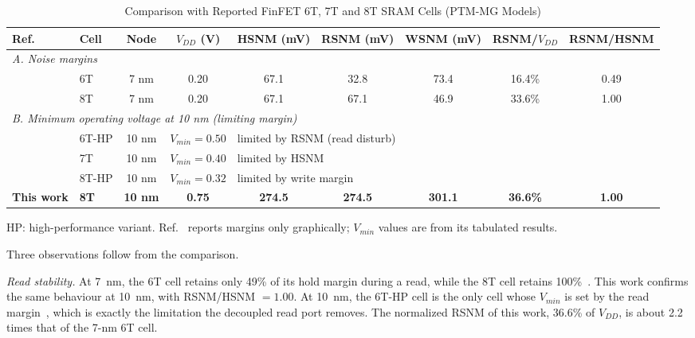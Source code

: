 \documentclass[conference]{IEEEtran}
\begin{document}
\begin{table}[t]
\centering
\begin{threeparttable}
\caption{Comparison with Reported FinFET 6T, 7T and 8T SRAM Cells (PTM-MG Models)}
\label{tab:compare}
\begin{tabular}{llccccccc}
\toprule
\textbf{Ref.} & \textbf{Cell} & \textbf{Node} & \textbf{$V_{DD}$ (V)} & \textbf{HSNM (mV)} & \textbf{RSNM (mV)} & \textbf{WSNM (mV)} & \textbf{RSNM/$V_{DD}$} & \textbf{RSNM/HSNM} \\
\midrule
\multicolumn{9}{l}{\textit{A. Noise margins}} \\
\cite{abbasian2022comp} & 6T & 7 nm & 0.20 & 67.1 & 32.8 & 73.4 & 16.4\% & 0.49 \\
\cite{abbasian2022comp} & 8T & 7 nm & 0.20 & 67.1 & 67.1 & 46.9 & 33.6\% & 1.00 \\
\midrule
\multicolumn{9}{l}{\textit{B. Minimum operating voltage at 10 nm (limiting margin)}} \\
\cite{ansari2015near7t} & 6T-HP & 10 nm & $V_{min}=0.50$ & \multicolumn{5}{l}{limited by RSNM (read disturb)} \\
\cite{ansari2015near7t} & 7T & 10 nm & $V_{min}=0.40$ & \multicolumn{5}{l}{limited by HSNM} \\
\cite{ansari2015near7t} & 8T-HP & 10 nm & $V_{min}=0.32$ & \multicolumn{5}{l}{limited by write margin} \\
\midrule
\textbf{This work} & \textbf{8T} & \textbf{10 nm} & \textbf{0.75} & \textbf{274.5} & \textbf{274.5} & \textbf{301.1} & \textbf{36.6\%} & \textbf{1.00} \\
\bottomrule
\end{tabular}
\begin{tablenotes}\footnotesize
\item HP: high-performance variant. Ref.~\cite{ansari2015near7t} reports margins only graphically; $V_{min}$ values are from its tabulated results.
\end{tablenotes}
\end{threeparttable}
\end{table}

Three observations follow from the comparison.

\textit{Read stability.} At 7~nm, the 6T cell retains only 49\% of its hold margin during a read, while the 8T cell retains 100\%~\cite{abbasian2022comp}. This work confirms the same behaviour at 10~nm, with RSNM/HSNM $=1.00$. At 10~nm, the 6T-HP cell is the only cell whose $V_{min}$ is set by the read margin~\cite{ansari2015near7t}, which is exactly the limitation the decoupled read port removes. The normalized RSNM of this work, 36.6\% of $V_{DD}$, is about 2.2 times that of the 7-nm 6T cell.
\end{document}
